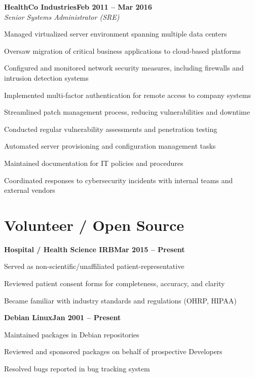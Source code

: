 \documentclass[letterpaper,10pt]{article}
\newcommand{\heading}[2]{
  \hspace{10pt}#1\hfill#2\\
}
\newcommand{\headingBf}[2]{
  \heading{\textbf{#1}}{\textbf{#2}}
}
\newcommand{\headingIt}[2]{
  \heading{\textit{#1}}{\textit{#2}}
}
\newenvironment{resume_list}{
  \vspace{-7pt}
  \begin{itemize}[itemsep=-2px, parsep=1pt, leftmargin=30pt]
}{
  \end{itemize}
}
\begin{document}
  \headingBf{HealthCo Industries}{Feb 2011 -- Mar 2016}
  \headingIt{Senior Systems Administrator (SRE)}{}
  \begin{resume_list}
    \item Managed virtualized server environment spanning multiple data centers
    \item Oversaw migration of critical business applications to cloud-based platforms
    \item Configured and monitored network security measures, including firewalls and intrusion detection systems
    \item Implemented multi-factor authentication for remote access to company systems
    \item Streamlined patch management process, reducing vulnerabilities and downtime
    \item Conducted regular vulnerability assessments and penetration testing
    \item Automated server provisioning and configuration management tasks
    \item Maintained documentation for IT policies and procedures
    \item Coordinated responses to cybersecurity incidents with internal teams and external vendors
  \end{resume_list}



  \section{Volunteer / Open Source}

  \headingBf{Hospital / Health Science IRB}{Mar 2015 -- Present}
  \begin{resume_list}
    \item Served as non-scientific/unaffiliated patient-representative
    \item Reviewed patient consent forms for completeness, accuracy, and clarity
    \item Became familiar with industry standards and regulations (OHRP, HIPAA)
  \end{resume_list}

  \headingBf{Debian Linux}{Jan 2001 -- Present}
  \begin{resume_list}
    \item Maintained packages in Debian repositories
    \item Reviewed and sponsored packages on behalf of prospective Developers
    \item Resolved bugs reported in bug tracking system
  \end{resume_list}
\end{document}
